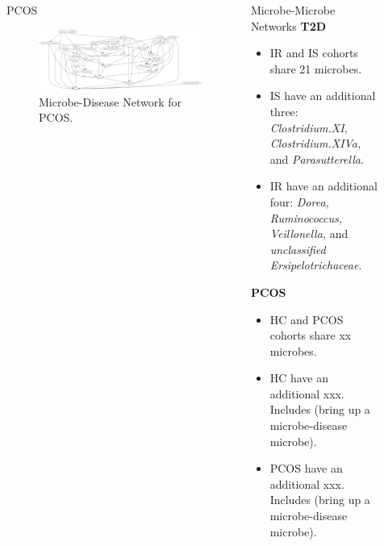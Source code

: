 \documentclass[final]{beamer}
\newlength{\sepwidth}
\newlength{\colwidth}
\newcommand{\separatorcolumn}{\begin{column}{\sepwidth}\end{column}}
\begin{document}
\begin{frame}[t]
\begin{columns}[t]
\begin{column}{\colwidth}
\end{column}

\separatorcolumn
\begin{column}{0.65\textwidth}
  
  \begin{columns}[t]
      \begin{column}{0.5\linewidth}
        \begin{block}{PCOS}
        \begin{figure}
          \centering
          \includegraphics[width=1.0\textwidth]{../graphs/pcos/cdnod_norm.png}
          \caption{Microbe-Disease Network for PCOS.}
        \end{figure}
      \end{block}
      \end{column}
      \begin{column}{0.5\linewidth}
        \begin{block}{Microbe-Microbe Networks}
        \textbf{T2D}
        \begin{itemize}
          \item IR and IS cohorts share 21 microbes.
          \item IS have an additional three: \textit{Clostridium.XI, Clostridium.XIVa,} and \textit{Parasutterella}.
          \item IR have an additional four: \textit{Dorea, Ruminococcus, Veillonella,} and \textit{unclassified Ersipelotrichaceae}. 
        \end{itemize}
        \textbf{PCOS}
        \begin{itemize}
          \item HC and PCOS cohorts share xx microbes.
          \item HC have an additional xxx. Includes (bring up a microbe-disease microbe). 
          \item PCOS have an additional xxx. Includes (bring up a microbe-disease microbe). 
        \end{itemize}
      \end{block}
      \end{column}
  \end{columns}
  

\end{column}
\end{columns}
\end{frame}
\end{document}
